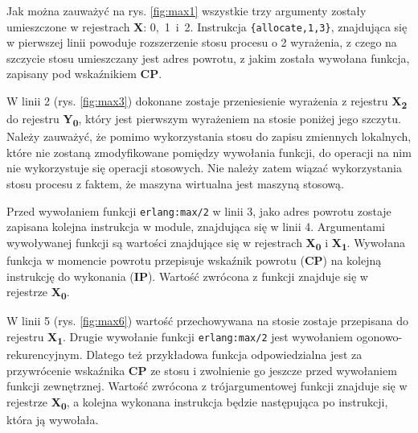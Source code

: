 Jak można zauważyć na rys. \ref{fig:max1} wszystkie trzy argumenty zostały umieszczone w rejestrach \textbf{X}: 0,~1~i~2. Instrukcja \texttt{\{allocate,1,3\}}, znajdująca się w pierwszej linii powoduje rozszerzenie stosu procesu o 2 wyrażenia, z czego na szczycie stosu umieszczany jest adres powrotu, z jakim została wywołana funkcja, zapisany pod wskaźnikiem \textbf{CP}.

W linii 2 (rys. \ref{fig:max3}) dokonane zostaje przeniesienie wyrażenia z rejestru \textbf{X\textsubscript{2}} do rejestru \textbf{Y\textsubscript{0}}, który jest pierwszym wyrażeniem na stosie poniżej jego szczytu.
Należy zauważyć, że pomimo wykorzystania stosu do zapisu zmiennych lokalnych, które nie zostaną zmodyfikowane pomiędzy wywołania funkcji, do operacji na nim nie wykorzystuje się operacji stosowych.
Nie należy zatem wiązać wykorzystania stosu procesu z faktem, że maszyna wirtualna jest maszyną stosową.

Przed wywołaniem funkcji \texttt{erlang:max/2} w linii 3, jako adres powrotu zostaje zapisana kolejna instrukcja w module, znajdująca się w linii 4. Argumentami wywoływanej funkcji są wartości znajdujące się w rejestrach \textbf{X\textsubscript{0}} i \textbf{X\textsubscript{1}}. Wywołana funkcja w momencie powrotu przepisuje wskaźnik powrotu (\textbf{CP}) na kolejną instrukcję do wykonania (\textbf{IP}). Wartość zwrócona z funkcji znajduje się w rejestrze \textbf{X\textsubscript{0}}. 

W linii 5 (rys. \ref{fig:max6}) wartość przechowywana na stosie zostaje przepisana do rejestru \textbf{X\textsubscript{1}}.
Drugie wywołanie funkcji \texttt{erlang:max/2} jest wywołaniem ogonowo-rekurencyjnym.
Dlatego też przykładowa funkcja odpowiedzialna jest za przywrócenie wskaźnika \textbf{CP} ze stosu i zwolnienie go jeszcze przed wywołaniem funkcji zewnętrznej. 
Wartość zwrócona z trójargumentowej funkcji znajduje się w rejestrze \textbf{X\textsubscript{0}}, a kolejna wykonana instrukcja będzie następująca po instrukcji, która ją wywołała.

